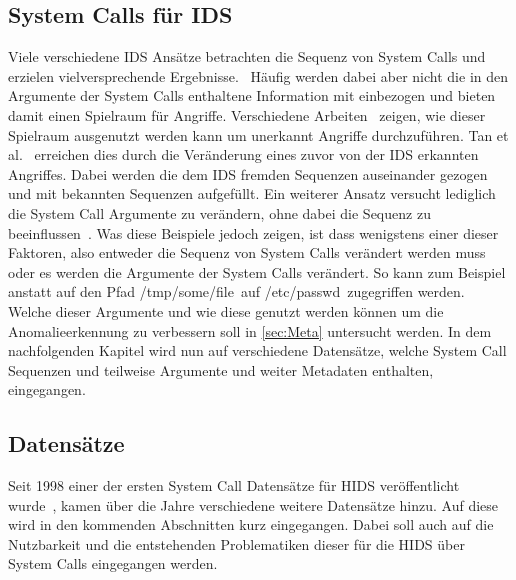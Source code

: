         \subsection{System Calls für IDS}
            Viele verschiedene \ac{IDS} Ansätze betrachten die Sequenz von System Calls und erzielen vielversprechende Ergebnisse.~\cite{MAGGI}
            Häufig werden dabei aber nicht die in den Argumente der System Calls enthaltene Information mit einbezogen und bieten damit einen Spielraum für Angriffe.
            Verschiedene Arbeiten~\cite{Syscallseqexploit1, Syscallseqexploit2, Syscallseqexploit3} zeigen, wie dieser Spielraum ausgenutzt werden kann um unerkannt Angriffe durchzuführen. 
            Tan et al.~\cite{Syscallseqexploit3} erreichen dies durch die Veränderung eines zuvor von der \ac{IDS} erkannten Angriffes.
            Dabei werden die dem \ac{IDS} fremden Sequenzen auseinander gezogen und mit bekannten Sequenzen aufgefüllt. 
            Ein weiterer Ansatz versucht lediglich die System Call Argumente zu verändern, ohne dabei die Sequenz zu beeinflussen~\cite{Syscallseqexploit1}.
            Was diese Beispiele jedoch zeigen, ist dass wenigstens einer dieser Faktoren, also entweder die Sequenz von System Calls verändert werden muss oder es werden die Argumente der System Calls verändert.
            So kann zum Beispiel anstatt auf den Pfad \glqq /tmp/some/file\grqq \ auf \glqq /etc/passwd\grqq \ zugegriffen werden. 
            Welche dieser Argumente und wie diese genutzt werden können um die Anomalieerkennung zu verbessern soll in \autoref{sec:Meta} untersucht werden.
            In dem nachfolgenden Kapitel wird nun auf verschiedene Datensätze, welche System Call Sequenzen und teilweise Argumente und weiter Metadaten enthalten, eingegangen.

        \subsection{Datensätze}\label{sec:Datensatz}
            Seit 1998 einer der ersten System Call Datensätze für \ac{HIDS} veröffentlicht wurde~\cite{DARPA, KDD},
            kamen über die Jahre verschiedene weitere Datensätze hinzu.
            Auf diese wird in den kommenden Abschnitten kurz eingegangen.
            Dabei soll auch auf die Nutzbarkeit und die entstehenden Problematiken dieser für die \ac{HIDS} über System Calls eingegangen werden.
